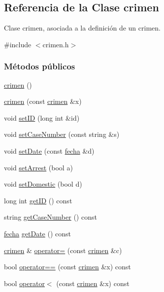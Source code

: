\hypertarget{classcrimen}{\subsection{Referencia de la Clase crimen}
\label{classcrimen}
}


Clase crimen, asociada a la definición de un crimen.  




{\ttfamily \#include $<$crimen.\-h$>$}

\subsubsection*{Métodos públicos}
\begin{DoxyCompactItemize}
\item 
\hyperlink{classcrimen_ab1147e36869c7e635699e4ef746a7555}{crimen} ()
\item 
\hyperlink{classcrimen_a50b783e821c2f5bc829eceb9048c12d7}{crimen} (const \hyperlink{classcrimen}{crimen} \&x)
\item 
void \hyperlink{classcrimen_a2675734f5049f41b5fb5dbc4778df7f8}{set\-I\-D} (long int \&id)
\item 
void \hyperlink{classcrimen_a98ee8c42a0ec09c704c5f17e812a6bd5}{set\-Case\-Number} (const string \&s)
\item 
void \hyperlink{classcrimen_ac308c139bb8b599a7badbecd91bfbc5a}{set\-Date} (const \hyperlink{classfecha}{fecha} \&d)
\item 
void \hyperlink{classcrimen_ae08b85470038469179a01ba753b7641a}{set\-Arrest} (bool a)
\item 
void \hyperlink{classcrimen_a3ec14cf4bb0464350d8efd98d2679d41}{set\-Domestic} (bool d)
\item 
long int \hyperlink{classcrimen_a855eab30a304a6498828cb5d85a4e0e3}{get\-I\-D} () const 
\item 
string \hyperlink{classcrimen_ab3c025eb20cdcea9192ee190fa2af015}{get\-Case\-Number} () const 
\item 
\hyperlink{classfecha}{fecha} \hyperlink{classcrimen_a8a6712e536211034819441ab87e1c215}{get\-Date} () const 
\item 
\hyperlink{classcrimen}{crimen} \& \hyperlink{classcrimen_a675f3a6e34bf43e20613a96b93cbb407}{operator=} (const \hyperlink{classcrimen}{crimen} \&c)
\item 
bool \hyperlink{classcrimen_aeced9ce4b7486123412975b8884d1ab7}{operator==} (const \hyperlink{classcrimen}{crimen} \&x) const 
\item 
bool \hyperlink{classcrimen_ac865fdb9712f2426d947b1b5546b50e5}{operator$<$} (const \hyperlink{classcrimen}{crimen} \&x) const 
\end{DoxyCompactItemize}
